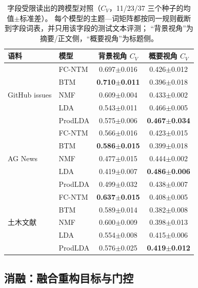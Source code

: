 \documentclass[11pt]{ctexart}
\newcommand{\fcntm}{FC-NTM}
\begin{document}
\begin{table}[t]
\centering
\caption{字段受限读出的跨模型对照（$C_V$，11/23/37 三个种子的均值$\pm$标准差）。
每个模型的主题—词矩阵都按同一规则截断到字段词表，并只用该字段的测试文本评测；
“背景视角”为摘要/正文侧，“概要视角”为标题侧。}
\label{tab:fieldview}
\label{tab:fieldview-baselines}
\small
\setlength{\tabcolsep}{4pt}
\begin{tabular}{@{}llcc@{}}
\toprule
语料 & 模型 & 背景视角 $C_V$ & 概要视角 $C_V$ \\
\midrule
\multirow{5}{*}{GitHub issues}
 & \fcntm{} & 0.697$\pm$0.016 & 0.426$\pm$0.012 \\
 & BTM & \textbf{0.710$\pm$0.011} & 0.396$\pm$0.018 \\
 & NMF & 0.609$\pm$0.004 & 0.433$\pm$0.002 \\
 & LDA & 0.543$\pm$0.011 & 0.466$\pm$0.005 \\
 & ProdLDA & 0.575$\pm$0.006 & \textbf{0.467$\pm$0.034} \\
\midrule
\multirow{5}{*}{AG News}
 & \fcntm{} & 0.566$\pm$0.016 & 0.423$\pm$0.015 \\
 & BTM & \textbf{0.586$\pm$0.015} & 0.399$\pm$0.018 \\
 & NMF & 0.477$\pm$0.015 & 0.444$\pm$0.002 \\
 & LDA & 0.419$\pm$0.007 & \textbf{0.486$\pm$0.006} \\
 & ProdLDA & 0.499$\pm$0.032 & 0.438$\pm$0.007 \\
\midrule
\multirow{5}{*}{土木文献}
 & \fcntm{} & \textbf{0.637$\pm$0.015} & 0.408$\pm$0.005 \\
 & BTM & 0.589$\pm$0.014 & 0.382$\pm$0.008 \\
 & NMF & 0.600$\pm$0.009 & 0.398$\pm$0.013 \\
 & LDA & 0.554$\pm$0.008 & 0.415$\pm$0.006 \\
 & ProdLDA & 0.576$\pm$0.025 & \textbf{0.419$\pm$0.012} \\
\bottomrule
\end{tabular}
\end{table}

\subsection{消融：融合重构目标与门控}
\label{sec:fusion-ablation}
\end{document}
